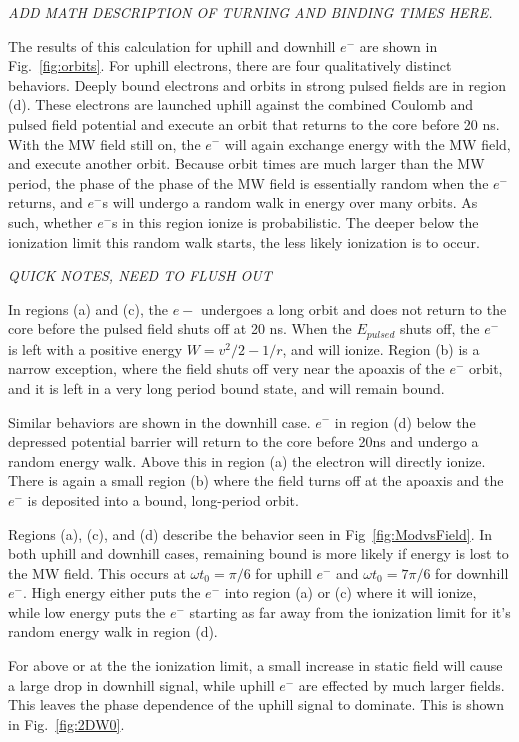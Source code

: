 \documentclass[aps,pra,preprint,groupedaddress]{revtex4-1}
\begin{document}
\emph{ADD MATH DESCRIPTION OF TURNING AND BINDING TIMES HERE.}

The results of this calculation for uphill and downhill $e^-$ are shown in Fig.~\ref{fig:orbits}. For uphill electrons, there are four qualitatively distinct behaviors. Deeply bound electrons and orbits in strong pulsed fields are in region (d). These electrons are launched uphill against the combined Coulomb and pulsed field potential and execute an orbit that returns to the core before 20 ns. With the MW field still on, the $e^-$ will again exchange energy with the MW field, and execute another orbit. Because orbit times are much larger than the MW period, the phase of the phase of the MW field is essentially random when the $e^-$ returns, and $e^-$s will undergo a random walk in energy over many orbits. As such, whether $e^-$s in this region ionize is probabilistic. The deeper below the ionization limit this random walk starts, the less likely ionization is to occur.

\emph{QUICK NOTES, NEED TO FLUSH OUT}

In regions (a) and (c), the $e-$ undergoes a long orbit and does not return to the core before the pulsed field shuts off at 20 ns. When the $E_{pulsed}$ shuts off, the $e^-$ is left with a positive energy $W = v^2/2 - 1/r$, and will ionize. Region (b) is a narrow exception, where the field shuts off very near the apoaxis of the $e^-$ orbit, and it is left in a very long period bound state, and will remain bound.

Similar behaviors are shown in the downhill case. $e^-$ in region (d) below the depressed potential barrier will return to the core before 20ns and undergo a random energy walk. Above this in region (a) the electron will directly ionize. There is again a small region (b) where the field turns off at the apoaxis and the $e^-$ is deposited into a bound, long-period orbit.

Regions (a), (c), and (d) describe the behavior seen in Fig~\ref{fig:ModvsField}. In both uphill and downhill cases, remaining bound is more likely if energy is lost to the MW field. This occurs at $\omega t_0 = \pi/6$ for uphill $e^-$ and $\omega t_0 = 7\pi/6$ for downhill $e^-$. High energy either puts the $e^-$ into region (a) or (c) where it will ionize, while low energy puts the $e^-$ starting as far away from the ionization limit for it's random energy walk in region (d).

For above or at the the ionization limit, a small increase in static field will cause a large drop in downhill signal, while uphill $e^-$ are effected by much larger fields. This leaves the phase dependence of the uphill signal to dominate. This is shown in Fig.~\ref{fig:2DW0}.
\end{document}
